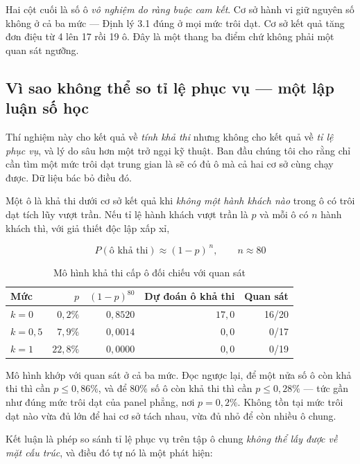 Hai cột cuối là số ô \emph{vô nghiệm do ràng buộc cam kết}. Cơ sở hành vi giữ nguyên số không ở
cả ba mức --- Định lý 3.1 đúng ở mọi mức trôi dạt. Cơ sở kết quả tăng đơn điệu từ 4 lên 17 rồi
19 ô. Đây là một thang ba điểm chứ không phải một quan sát ngưỡng.

\subsection{Vì sao không thể so tỉ lệ phục vụ --- một lập luận số học}

Thí nghiệm này cho kết quả về \emph{tính khả thi} nhưng không cho kết quả về \emph{tỉ lệ phục
vụ}, và lý do sâu hơn một trở ngại kỹ thuật. Ban đầu chúng tôi cho rằng chỉ cần tìm một mức
trôi dạt trung gian là sẽ có đủ ô mà cả hai cơ sở cùng chạy được. Dữ liệu bác bỏ điều đó.

Một ô là khả thi dưới cơ sở kết quả khi \emph{không một hành khách nào} trong ô có trôi dạt tích
lũy vượt trần. Nếu tỉ lệ hành khách vượt trần là $p$ và mỗi ô có $n$ hành khách thì, với giả
thiết độc lập xấp xỉ,

\begin{equation}
P(\text{ô khả thi}) \approx (1-p)^{\,n}, \qquad n \approx 80
\end{equation}

\begin{table}[htbp]
\centering
\caption{Mô hình khả thi cấp ô đối chiếu với quan sát}
\label{bang:mohinh-kha-thi}
\small
\begin{tabular}{@{}lrrrr@{}}
\toprule
\textbf{Mức} & $p$ & $(1-p)^{80}$ & \textbf{Dự đoán ô khả thi} & \textbf{Quan sát}\\
\midrule
$k=0$ & $0{,}2\%$ & $0{,}8520$ & $17{,}0$ & 16/20\\
$k=0{,}5$ & $7{,}9\%$ & $0{,}0014$ & $0{,}0$ & 0/17\\
$k=1$ & $22{,}8\%$ & $0{,}0000$ & $0{,}0$ & 0/19\\
\bottomrule
\end{tabular}
\end{table}

Mô hình khớp với quan sát ở cả ba mức. Đọc ngược lại, để một nửa số ô còn khả thi thì cần
$p \le 0{,}86\%$, và để $80\%$ số ô còn khả thi thì cần $p \le 0{,}28\%$ --- tức gần như đúng
mức trôi dạt của panel phẳng, nơi $p = 0{,}2\%$. Không tồn tại mức trôi dạt nào vừa đủ lớn để
hai cơ sở tách nhau, vừa đủ nhỏ để còn nhiều ô chung.

Kết luận là phép so sánh tỉ lệ phục vụ trên tập ô chung \emph{không thể lấy được về mặt cấu
trúc}, và điều đó tự nó là một phát hiện:

